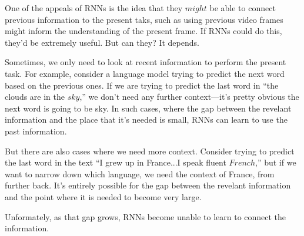 \documentclass[12pt]{article} %
\begin{document}
One of the appeals of RNNs is the idea that they $might$ be able to connect previous information to the present taks, such as using previous video frames might inform the understanding of the present frame. If RNNs could do this, they'd be extremely useful. But can they? It depends.

Sometimes, we only need to look at recent information to perform the present task. For example, consider a language model trying to predict the next word based on the previous ones. If we are trying to predict the last word in ``the clouds are in the $sky$,'' we don't need any further context---it's pretty obvious the next word is going to be sky. In such cases, where the gap between the revelant information and the place that it's needed is small, RNNs can learn to use the past information.

\begin{figure}[H] %
\label{fig:rnnunrolled}
\end{figure}

But there are also cases where we need more context. Consider trying to predict the last word in the text ``I grew up in France...I speak fluent $French$,'' but if we want to narrow down which language, we need the context of France, from further back. It's entirely possible for the gap between the revelant information and the point where it is needed to become very large.

Unformately, as that gap grows, RNNs become unable to learn to connect the information.
\begin{figure}[H] %
\label{fig:rnnunrolled}
\end{figure}
\end{document}
